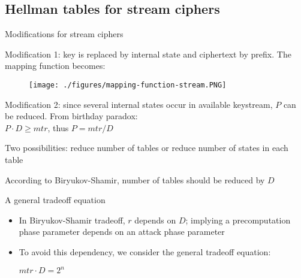 \documentclass{beamer}
\begin{document}
\subsection{Hellman tables for stream ciphers}
\begin{frame}{Modifications for stream ciphers}
\begin{itemize}
\footnotesize{
	\item Modification 1: key is replaced by internal state and ciphertext by prefix. The mapping function becomes:
	\begin{figure}[htp]
	\centering
	\texttt{[image: ./figures/mapping-function-stream.PNG]}
	\end{figure}
	\item Modification 2: since several internal states occur in available keystream, $P$ can be reduced. From birthday paradox:\\
	$P \cdot D \geq mtr$, thus $P = mtr/D$
	\begin{itemize}
	\footnotesize{
		\item Two possibilities: reduce number of tables or reduce number of states in each table
		\item According to Biryukov-Shamir, number of tables should be reduced by $D$
	}\end{itemize}
	\item 

}
\end{itemize}
\end{frame}

\begin{frame}{A general tradeoff equation}
\begin{itemize}
	\item In Biryukov-Shamir tradeoff, $r$ depends on $D$; implying a precomputation phase parameter depends on an attack phase parameter
	\item To avoid this dependency, we consider the general tradeoff equation:\\
	\begin{center}
	$mtr \cdot D = 2^n$
	\end{center}
\end{itemize}
\end{frame}
\end{document}
